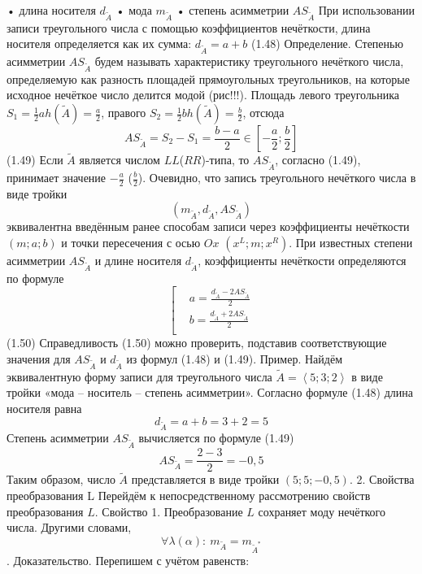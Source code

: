 •	длина носителя ${{d}_{{\tilde{A}}}}$ 
•	мода ${{m}_{{\tilde{A}}}}$ 
•	степень асимметрии $A{{S}_{{\tilde{A}}}}$
При использовании записи треугольного числа с помощью коэффициентов нечёткости, длина носителя определяется как их сумма:
	${{d}_{{\tilde{A}}}}=a+b$ 	(1.48)
Определение. Степенью асимметрии $A{{S}_{{\tilde{A}}}}$ будем называть характеристику треугольного нечёткого числа, определяемую как разность площадей прямоугольных треугольников, на которые исходное нечёткое число делится модой (рис!!!).
Площадь левого треугольника ${{S}_{1}}=\frac{1}{2}ah(\tilde{A})=\frac{a}{2}$, правого ${{S}_{2}}=\frac{1}{2}bh\left( {\tilde{A}} \right)=\frac{b}{2}$, отсюда
	\[A{{S}_{{\tilde{A}}}}={{S}_{2}}-{{S}_{1}}=\frac{b-a}{2}\in \left[ -\frac{a}{2};\frac{b}{2} \right]\] 	(1.49)
Если $\tilde{A}$ является числом $LL$($RR$)-типа, то $A{{S}_{{\tilde{A}}}}$, согласно (1.49), принимает значение $-\frac{a}{2}$ ($\frac{b}{2}$).
Очевидно, что запись треугольного нечёткого числа в виде тройки \[\left( {{m}_{{\tilde{A}}}},{{d}_{{\tilde{A}}}},A{{S}_{{\tilde{A}}}} \right)\] эквивалентна введённым ранее способам записи через коэффициенты нечёткости $\left( m;a;b \right)$ и точки пересечения с осью $Ox$ $\left( {{x}^{L}};m;{{x}^{R}} \right)$. При известных степени асимметрии $A{{S}_{{\tilde{A}}}}$ и длине носителя ${{d}_{{\tilde{A}}}}$, коэффициенты нечёткости определяются по формуле
	\[\left[ \begin{aligned}
  & a=\frac{{{d}_{{\tilde{A}}}}-2A{{S}_{{\tilde{A}}}}}{2} \\ 
 & b=\frac{{{d}_{{\tilde{A}}}}+2A{{S}_{{\tilde{A}}}}}{2} \\ 
\end{aligned} \right.\] 	(1.50)
Справедливость (1.50) можно проверить, подставив соответствующие значения для $A{{S}_{{\tilde{A}}}}$ и ${{d}_{{\tilde{A}}}}$ из формул (1.48) и (1.49).
Пример. Найдём эквивалентную форму записи для треугольного числа $\tilde{A}=\left\langle 5;3;2 \right\rangle $ в виде тройки «мода – носитель – степень асимметрии».
Согласно формуле (1.48) длина носителя равна
	\[{{d}_{{\tilde{A}}}}=a+b=3+2=5\]
Степень асимметрии $A{{S}_{{\tilde{A}}}}$ вычисляется по формуле (1.49)
	\[A{{S}_{{\tilde{A}}}}=\frac{2-3}{2}=-0,5\] 
Таким образом, число $\tilde{A}$ представляется в виде тройки $\left( 5;5;-0,5 \right)$.
2. Свойства преобразования L
Перейдём к непосредственному рассмотрению свойств преобразования $L$.
Свойство 1. Преобразование $L$ сохраняет моду нечёткого числа. Другими словами, \[\forall \lambda (\alpha ):\ {{m}_{{\tilde{A}}}}={{m}_{{{{\tilde{A}}}^{*}}}}\].
Доказательство. Перепишем с учётом равенств:
